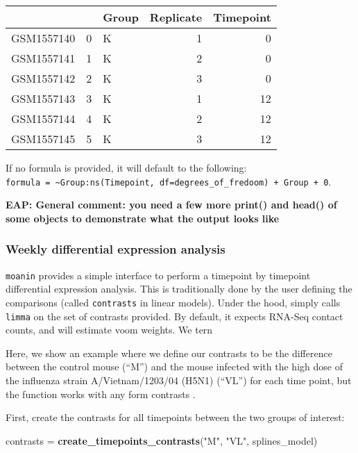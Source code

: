 \documentclass[9pt,a4paper,]{extarticle}
\newenvironment{Shaded}{\begin{snugshade}}{\end{snugshade}}
\newcommand{\KeywordTok}[1]{\textcolor[rgb]{0.13,0.29,0.53}{\textbf{#1}}}
\newcommand{\NormalTok}[1]{#1}
\newcommand{\StringTok}[1]{\textcolor[rgb]{0.31,0.60,0.02}{#1}}
\begin{document}
\begin{tabular}{l|r|l|r|r}
\hline
  &  & Group & Replicate & Timepoint\\
\hline
GSM1557140 & 0 & K & 1 & 0\\
\hline
GSM1557141 & 1 & K & 2 & 0\\
\hline
GSM1557142 & 2 & K & 3 & 0\\
\hline
GSM1557143 & 3 & K & 1 & 12\\
\hline
GSM1557144 & 4 & K & 2 & 12\\
\hline
GSM1557145 & 5 & K & 3 & 12\\
\hline
\end{tabular}

If no formula is provided, it will default to the following:
\texttt{formula\ =\ \textasciitilde{}Group:ns(Timepoint,\ df=degrees\_of\_fredoom)\ +\ Group\ +\ 0}.

\textbf{EAP: General comment: you need a few more print() and head() of some objects
to demonstrate what the output looks like}

\hypertarget{weekly-differential-expression-analysis}{%
\subsubsection{Weekly differential expression analysis}\label{weekly-differential-expression-analysis}}

\texttt{moanin} provides a simple interface to perform a timepoint by timepoint
differential expression analysis. This is traditionally done by the user
defining the comparisons (called \texttt{contrasts} in linear models). Under the
hood, simply calls \texttt{limma} \citep{ritchie:limma} on the set of contrasts provided.
By default, it expects RNA-Seq contact counts, and will estimate voom weights.
We tern

Here, we show an example where we define our contrasts to be the difference
between the control mouse (``M'') and the mouse infected with the high dose of
the influenza strain A/Vietnam/1203/04 (H5N1) (``VL'') for each time point, but
the function works with any form contrasts \citep{ritchie:limma}.

First, create the contrasts for all timepoints between the two groups of
interest:

\begin{Shaded}
\begin{Highlighting}[]
\NormalTok{contrasts =}\StringTok{ }\KeywordTok{create_timepoints_contrasts}\NormalTok{(}\StringTok{"M"}\NormalTok{, }\StringTok{"VL"}\NormalTok{, splines_model)}
\end{Highlighting}
\end{Shaded}
\end{document}
